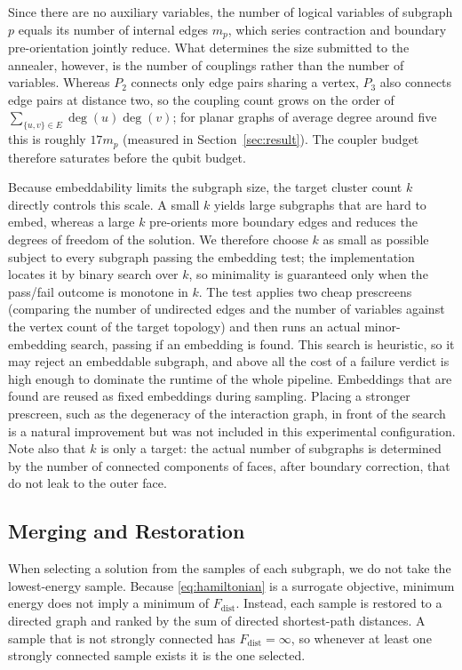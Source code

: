 \documentclass[twocolumn,a4paper]{article}
\begin{document}
Since there are no auxiliary variables, the number of logical variables of subgraph \(p\) equals its number of internal edges \(m_p\), which series contraction and boundary pre-orientation jointly reduce. What determines the size submitted to the annealer, however, is the number of couplings rather than the number of variables. Whereas \(P_2\) connects only edge pairs sharing a vertex, \(P_3\) also connects edge pairs at distance two, so the coupling count grows on the order of \(\sum_{\{u,v\}\in E}\deg(u)\deg(v)\); for planar graphs of average degree around five this is roughly \(17m_p\) (measured in Section~\ref{sec:result}). The coupler budget therefore saturates before the qubit budget.

Because embeddability limits the subgraph size, the target cluster count \(k\) directly controls this scale. A small \(k\) yields large subgraphs that are hard to embed, whereas a large \(k\) pre-orients more boundary edges and reduces the degrees of freedom of the solution. We therefore choose \(k\) as small as possible subject to every subgraph passing the embedding test; the implementation locates it by binary search over \(k\), so minimality is guaranteed only when the pass/fail outcome is monotone in \(k\). The test applies two cheap prescreens (comparing the number of undirected edges and the number of variables against the vertex count of the target topology) and then runs an actual minor-embedding search, passing if an embedding is found. This search is heuristic, so it may reject an embeddable subgraph, and above all the cost of a failure verdict is high enough to dominate the runtime of the whole pipeline. Embeddings that are found are reused as fixed embeddings during sampling. Placing a stronger prescreen, such as the degeneracy of the interaction graph, in front of the search is a natural improvement but was not included in this experimental configuration. Note also that \(k\) is only a target: the actual number of subgraphs is determined by the number of connected components of faces, after boundary correction, that do not leak to the outer face.

\subsection{Merging and Restoration}

When selecting a solution from the samples of each subgraph, we do not take the lowest-energy sample. Because \eqref{eq:hamiltonian} is a surrogate objective, minimum energy does not imply a minimum of \(F_{\mathrm{dist}}\). Instead, each sample is restored to a directed graph and ranked by the sum of directed shortest-path distances. A sample that is not strongly connected has \(F_{\mathrm{dist}}=\infty\), so whenever at least one strongly connected sample exists it is the one selected.
\end{document}
